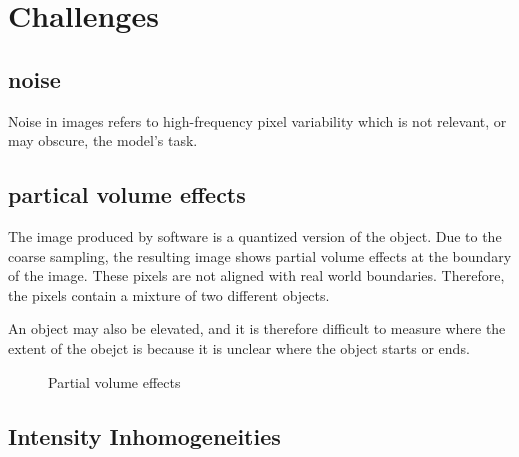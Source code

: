 \documentclass[11pt]{article}
\begin{document}
\section{Challenges}

\subsection{noise}

Noise in images refers to high-frequency pixel variability which is not relevant, or may obscure, the model's task.

\subsection{partical volume effects}

The image produced by software is a quantized version of the object. Due to the coarse sampling, the resulting image shows partial volume effects at the boundary of the image. These pixels are not aligned with real world boundaries. Therefore, the pixels contain a mixture of two different objects.

An object may also be elevated, and it is therefore difficult to measure where the extent of the obejct is because it is unclear where the object starts or ends.

\begin{figure}[H]
    \centering
    \caption{Partial volume effects}
\end{figure}

\subsection{Intensity Inhomogeneities}
\end{document}
